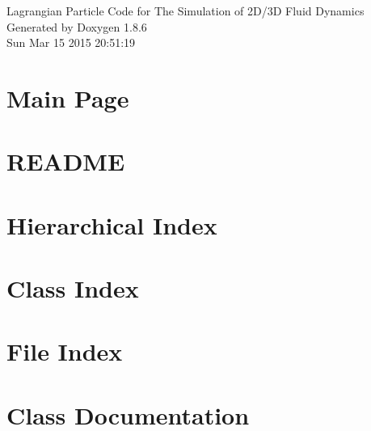 \documentclass[twoside]{book}
\newcommand{\clearemptydoublepage}{%
  \newpage{\pagestyle{empty}\cleardoublepage}%
}
\begin{document}
\hypersetup{pageanchor=false}
\begin{titlepage}
\vspace*{7cm}
\begin{center}%
{\Large Lagrangian Particle Code for The Simulation of 2\-D/3\-D Fluid Dynamics }\\
\vspace*{1cm}
{\large Generated by Doxygen 1.8.6}\\
\vspace*{0.5cm}
{\small Sun Mar 15 2015 20:51:19}\\
\end{center}
\end{titlepage}
\clearemptydoublepage
\tableofcontents
\clearemptydoublepage
{}
\hypersetup{pageanchor=true}

\chapter{Main Page}
\label{index}\hypertarget{index}{}
\chapter{R\-E\-A\-D\-M\-E}
\label{md_README}
\hypertarget{md_README}{}

\chapter{Hierarchical Index}

\chapter{Class Index}

\chapter{File Index}

\chapter{Class Documentation}







































\end{document}
